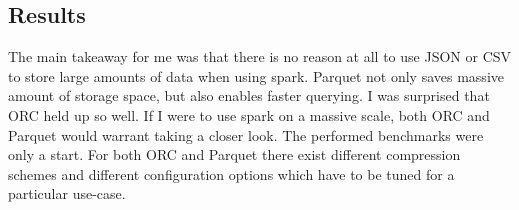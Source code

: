 \subsection{Results}
The main takeaway for me was that there is no reason at all to use JSON or CSV to store large amounts of data when using spark.
Parquet not only saves massive amount of storage space, but also enables faster querying.
I was surprised that ORC held up so well.
If I were to use spark on a massive scale, both ORC and Parquet would warrant taking a closer look.
The performed benchmarks were only a start.
For both ORC and Parquet there exist different compression schemes and different configuration options which have to be tuned for a particular use-case.